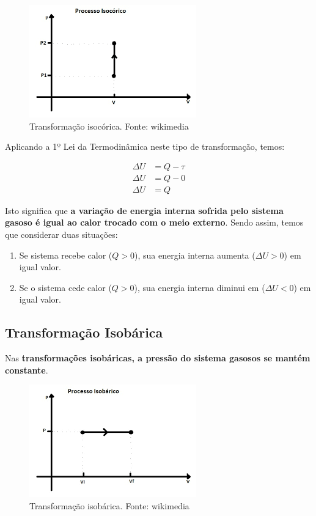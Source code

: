\documentclass[12pt]{article}
\begin{document}
\begin{figure}[h]{}
\centering\includegraphics[width=2.5truein]{img9.png}
\caption{Transformação isocórica. Fonte: wikimedia}
\centering
\end{figure}

Aplicando a 1º Lei da Termodinâmica neste tipo de transformação, temos:


\begin{align*}
    \Delta U &= Q - \tau\\
    \Delta U &= Q - 0\\
    \Delta U &= Q
\end{align*}


Isto significa que \textbf{a variação de energia interna sofrida pelo sistema gasoso é igual ao calor trocado com o meio externo}. Sendo assim, temos que considerar duas situações:


\begin{enumerate}

\item{Se sistema recebe calor ($Q>0$), sua energia interna aumenta ($\Delta U>0$) em igual valor.}

\item{Se o sistema cede calor ($Q>0$), sua energia interna diminui em ($\Delta U<0$) em igual valor.}

\end{enumerate}


\hypertarget{x-transformação-isobárica}{\subsection{Transformação Isobárica}}
Nas \textbf{transformações isobáricas, a pressão do sistema gasosos se mantém constante}.


\begin{figure}[h]{}
\centering\includegraphics[width=2.5truein]{img10.png}
\caption{Transformação isobárica. Fonte: wikimedia}
\centering
\end{figure}
\end{document}
